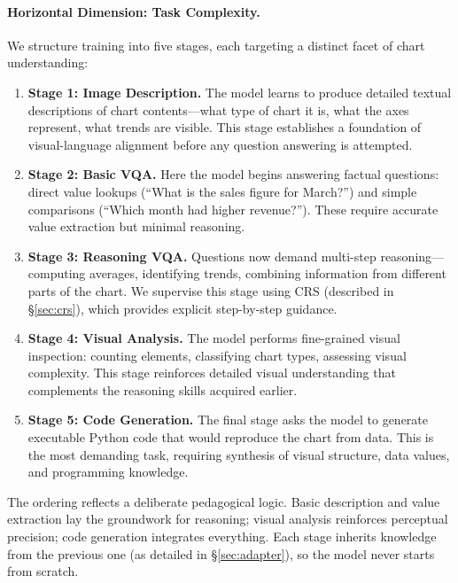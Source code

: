 \documentclass[journal]{IEEEtran}
\newcommand{\crs}{CRS}
\begin{document}
\paragraph{Horizontal Dimension: Task Complexity.}
We structure training into five stages, each targeting a distinct facet of chart understanding:
\begin{enumerate}
    \item \textbf{Stage 1: Image Description.} The model learns to produce detailed textual descriptions of chart contents---what type of chart it is, what the axes represent, what trends are visible. This stage establishes a foundation of visual-language alignment before any question answering is attempted.
    \item \textbf{Stage 2: Basic VQA.} Here the model begins answering factual questions: direct value lookups (``What is the sales figure for March?'') and simple comparisons (``Which month had higher revenue?''). These require accurate value extraction but minimal reasoning.
    \item \textbf{Stage 3: Reasoning VQA.} Questions now demand multi-step reasoning---computing averages, identifying trends, combining information from different parts of the chart. We supervise this stage using \crs{} (described in \S\ref{sec:crs}), which provides explicit step-by-step guidance.
    \item \textbf{Stage 4: Visual Analysis.} The model performs fine-grained visual inspection: counting elements, classifying chart types, assessing visual complexity. This stage reinforces detailed visual understanding that complements the reasoning skills acquired earlier.
    \item \textbf{Stage 5: Code Generation.} The final stage asks the model to generate executable Python code that would reproduce the chart from data. This is the most demanding task, requiring synthesis of visual structure, data values, and programming knowledge.
\end{enumerate}
The ordering reflects a deliberate pedagogical logic. Basic description and value extraction lay the groundwork for reasoning; visual analysis reinforces perceptual precision; code generation integrates everything. Each stage inherits knowledge from the previous one (as detailed in \S\ref{sec:adapter}), so the model never starts from scratch.
\end{document}
